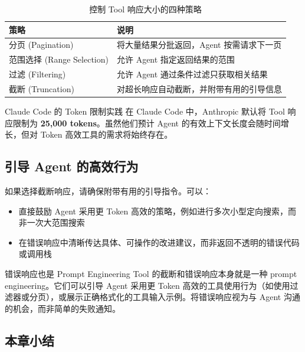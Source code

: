 \documentclass[a4paper]{article}
\begin{document}
\begin{table}[H]
\centering
\caption{控制 Tool 响应大小的四种策略}
\begin{tabular}{p{}p{}}
\toprule
\textbf{策略} & \textbf{说明} \\
\midrule
分页 (Pagination) & 将大量结果分批返回，Agent 按需请求下一页 \\
\midrule
范围选择 (Range Selection) & 允许 Agent 指定返回结果的范围 \\
\midrule
过滤 (Filtering) & 允许 Agent 通过条件过滤只获取相关结果 \\
\midrule
截断 (Truncation) & 对超长响应自动截断，并附带有用的引导信息 \\
\bottomrule
\end{tabular}
\end{table}

\begin{importantbox}{Claude Code 的 Token 限制实践}
在 Claude Code 中，Anthropic 默认将 Tool 响应限制为 \textbf{25,000 tokens}。虽然他们预计 Agent 的有效上下文长度会随时间增长，但对 Token 高效工具的需求将始终存在。
\end{importantbox}

\subsection{引导 Agent 的高效行为}

如果选择截断响应，请确保附带有用的引导指令。可以：

\begin{itemize}[leftmargin=1.5em]
    \item 直接鼓励 Agent 采用更 Token 高效的策略，例如进行多次小型定向搜索，而非一次大范围搜索
    \item 在错误响应中清晰传达具体、可操作的改进建议，而非返回不透明的错误代码或调用栈
\end{itemize}

\begin{knowledgebox}{错误响应也是 Prompt Engineering}
Tool 的截断和错误响应本身就是一种 prompt engineering。它们可以引导 Agent 采用更 Token 高效的工具使用行为（如使用过滤器或分页），或展示正确格式化的工具输入示例。将错误响应视为与 Agent 沟通的机会，而非简单的失败通知。
\end{knowledgebox}

\subsection{本章小结}
\end{document}
